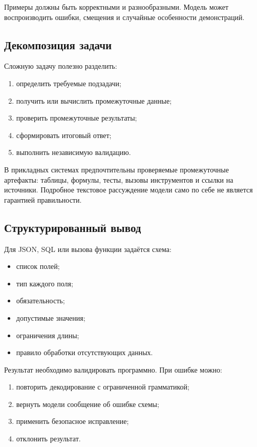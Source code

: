 \documentclass[12pt,a4paper]{article}
\newcommand{\1}{\mathbf{1}}
\theoremstyle{definition}
\theoremstyle{remark}
\begin{document}
Примеры должны быть корректными и разнообразными. Модель может
воспроизводить ошибки, смещения и случайные особенности демонстраций.

\subsection{Декомпозиция задачи}

Сложную задачу полезно разделить:

\begin{enumerate}
    \item определить требуемые подзадачи;
    \item получить или вычислить промежуточные данные;
    \item проверить промежуточные результаты;
    \item сформировать итоговый ответ;
    \item выполнить независимую валидацию.
\end{enumerate}

В прикладных системах предпочтительны проверяемые промежуточные
артефакты: таблицы, формулы, тесты, вызовы инструментов и ссылки на
источники. Подробное текстовое рассуждение модели само по себе не
является гарантией правильности.

\subsection{Структурированный вывод}

Для JSON, SQL или вызова функции задаётся схема:

\begin{itemize}
    \item список полей;
    \item тип каждого поля;
    \item обязательность;
    \item допустимые значения;
    \item ограничения длины;
    \item правило обработки отсутствующих данных.
\end{itemize}

Результат необходимо валидировать программно. При ошибке можно:

\begin{enumerate}
    \item повторить декодирование с ограниченной грамматикой;
    \item вернуть модели сообщение об ошибке схемы;
    \item применить безопасное исправление;
    \item отклонить результат.
\end{enumerate}
\end{document}
